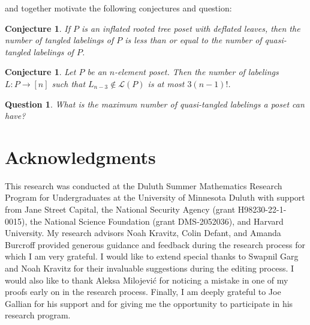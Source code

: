 \documentclass[11pt]{amsart}
\newtheorem{conjecture}[thm]{Conjecture}
\newtheorem{question}[thm]{Question}
\theoremstyle{definition}
\newcommand{\call}{\mathcal{L}}
\begin{document}
 and  together motivate the following conjectures and question: \begin{conjecture}
	If $ P $ is an inflated rooted tree poset with deflated leaves, then the number of tangled labelings of $ P $ is less than or equal to the number of quasi-tangled labelings of $ P $.
\end{conjecture}
\begin{conjecture}
	Let $ P $ be an $ n $-element poset. Then the number of labelings $ L:P\to[n] $ such that $ L_{n-3}\not\in\call(P) $ is at most $ 3(n-1)! $.
\end{conjecture}
\begin{question}
	What is the maximum number of quasi-tangled labelings a poset can have?
\end{question}

\section*{Acknowledgments}
This research was conducted at the Duluth Summer Mathematics Research Program for Undergraduates at the University of Minnesota Duluth with support from Jane Street Capital, the National Security Agency (grant H98230-22-1-0015), the National Science Foundation (grant DMS-2052036), and Harvard University. My research advisors Noah Kravitz, Colin Defant, and Amanda Burcroff provided generous guidance and feedback during the research process for which I am very grateful. I would like to extend special thanks to Swapnil Garg and Noah Kravitz for their invaluable suggestions during the editing process. I would also like to thank Aleksa Milojevi\'{c} for noticing a mistake in one of my proofs early on in the research process. Finally, I am deeply grateful to Joe Gallian for his support and for giving me the opportunity to participate in his research program.



\end{document}
